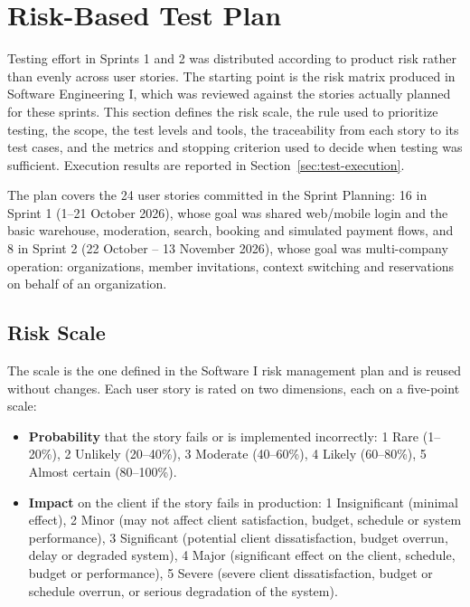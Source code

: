 \section{Risk-Based Test Plan}
\label{sec:test-plan}

Testing effort in Sprints 1 and 2 was distributed according to product risk rather than evenly
across user stories. The starting point is the risk matrix produced in Software Engineering I,
which was reviewed against the stories actually planned for these sprints. This section defines
the risk scale, the rule used to prioritize testing, the scope, the test levels and tools, the
traceability from each story to its test cases, and the metrics and stopping criterion used to
decide when testing was sufficient. Execution results are reported in
Section~\ref{sec:test-execution}.

The plan covers the 24 user stories committed in the Sprint Planning: 16 in Sprint 1
(1--21 October 2026), whose goal was shared web/mobile login and the basic warehouse,
moderation, search, booking and simulated payment flows, and 8 in Sprint 2
(22 October -- 13 November 2026), whose goal was multi-company operation: organizations,
member invitations, context switching and reservations on behalf of an organization.

\subsection{Risk Scale}

The scale is the one defined in the Software I risk management plan and is reused without
changes. Each user story is rated on two dimensions, each on a five-point scale:

\begin{itemize}[nosep]
  \item \textbf{Probability} that the story fails or is implemented incorrectly:
        1 Rare (1--20\%), 2 Unlikely (20--40\%), 3 Moderate (40--60\%), 4 Likely (60--80\%),
        5 Almost certain (80--100\%).
  \item \textbf{Impact} on the client if the story fails in production:
        1 Insignificant (minimal effect),
        2 Minor (may not affect client satisfaction, budget, schedule or system performance),
        3 Significant (potential client dissatisfaction, budget overrun, delay or degraded system),
        4 Major (significant effect on the client, schedule, budget or performance),
        5 Severe (severe client dissatisfaction, budget or schedule overrun, or serious
        degradation of the system).
\end{itemize}


